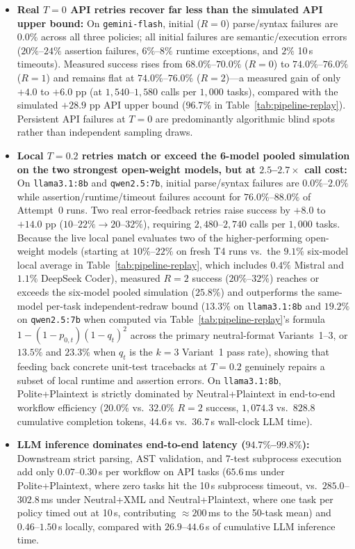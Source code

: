 \documentclass[a4paper,fleqn]{cas-sc}
\providecommand{\tightlist}{%
  \setlength{\itemsep}{0pt}\setlength{\parskip}{0pt}}
\begin{document}
\begin{itemize}
\tightlist
\item \textbf{Real $T = 0$ API retries recover far less than the simulated API upper bound:} On \texttt{gemini-flash}, initial ($R = 0$) parse/syntax failures are $0.0\%$ across all three policies; all initial failures are semantic/execution errors ($20\%$--$24\%$ assertion failures, $6\%$--$8\%$ runtime exceptions, and $2\%$ 10\,s timeouts). Measured success rises from $68.0\%$--$70.0\%$ ($R = 0$) to $74.0\%$--$76.0\%$ ($R = 1$) and remains flat at $74.0\%$--$76.0\%$ ($R = 2$)---a measured gain of only $+4.0$ to $+6.0$ pp (at $1{,}540$--$1{,}580$ calls per $1{,}000$ tasks), compared with the simulated $+28.9$ pp API upper bound ($96.7\%$ in Table~\ref{tab:pipeline-replay}). Persistent API failures at $T = 0$ are predominantly algorithmic blind spots rather than independent sampling draws.
\item \textbf{Local $T = 0.2$ retries match or exceed the 6-model pooled simulation on the two strongest open-weight models, but at $2.5$--$2.7\times$ call cost:} On \texttt{llama3.1:8b} and \texttt{qwen2.5:7b}, initial parse/syntax failures are $0.0\%$--$2.0\%$ while assertion/runtime/timeout failures account for $76.0\%$--$88.0\%$ of Attempt~0 runs. Two real error-feedback retries raise success by $+8.0$ to $+14.0$ pp ($10$--$22\% \to 20$--$32\%$), requiring $2{,}480$--$2{,}740$ calls per $1{,}000$ tasks. Because the live local panel evaluates two of the higher-performing open-weight models (starting at $10\%$--$22\%$ on fresh T4 runs vs.\ the $9.1\%$ six-model local average in Table~\ref{tab:pipeline-replay}, which includes $0.4\%$ Mistral and $1.1\%$ DeepSeek Coder), measured $R = 2$ success ($20\%$--$32\%$) reaches or exceeds the six-model pooled simulation ($25.8\%$) and outperforms the same-model per-task independent-redraw bound ($13.3\%$ on \texttt{llama3.1:8b} and $19.2\%$ on \texttt{qwen2.5:7b} when computed via Table~\ref{tab:pipeline-replay}'s formula $1 - (1 - p_{0,t})(1 - q_t)^2$ across the primary neutral-format Variants~1--3, or $13.5\%$ and $23.3\%$ when $q_t$ is the $k = 3$ Variant~1 pass rate), showing that feeding back concrete unit-test tracebacks at $T = 0.2$ genuinely repairs a subset of local runtime and assertion errors. On \texttt{llama3.1:8b}, Polite+Plaintext is strictly dominated by Neutral+Plaintext in end-to-end workflow efficiency ($20.0\%$ vs.\ $32.0\%$ $R = 2$ success, $1{,}074.3$ vs.\ $828.8$ cumulative completion tokens, $44.6$\,s vs.\ $36.7$\,s wall-clock LLM time).
\item \textbf{LLM inference dominates end-to-end latency ($94.7\%$--$99.8\%$):} Downstream strict parsing, AST validation, and 7-test subprocess execution add only $0.07$--$0.30$\,s per workflow on API tasks ($65.6$\,ms under Polite+Plaintext, where zero tasks hit the 10\,s subprocess timeout, vs.\ $285.0$--$302.8$\,ms under Neutral+XML and Neutral+Plaintext, where one task per policy timed out at 10\,s, contributing $\approx 200$\,ms to the 50-task mean) and $0.46$--$1.50$\,s locally, compared with $26.9$--$44.6$\,s of cumulative LLM inference time.
\end{itemize}
\end{document}
